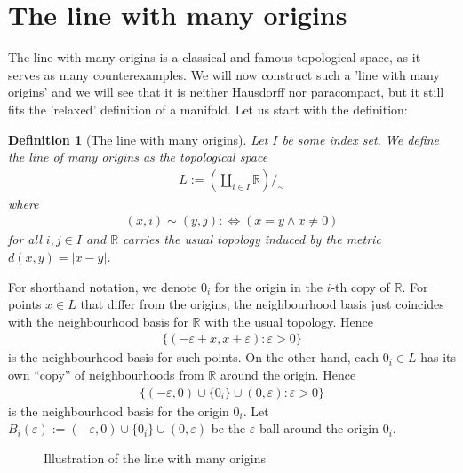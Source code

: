 \documentclass[a4paper, 12pt]{article}
\newtheorem{definition}{Definition}
\theoremstyle{iremark}
\newcommand{\R}{\mathbb{R}}
\begin{document}
\section{The line with many origins}
The line with many origins is a classical and famous topological space, as it serves as many counterexamples. 
We will now construct such a 'line with many origins' and we will see that it is neither Hausdorff nor paracompact, 
but it still fits the 'relaxed' definition of a manifold. Let us start with the definition:
\begin{definition}[The line with many origins]
    Let $I$ be some index set. We define the line of many origins as the topological space
    \begin{align*}
        L := \left(\coprod_{i\in I}\R\right)/_\sim
    \end{align*}
    where
    \begin{align*}
        (x, i)\sim (y,j) :\Leftrightarrow (x=y\land x\neq 0)
    \end{align*}
    for all $i,j\in I$ and $\R$ carries the usual topology induced by the metric $d(x,y) = \vert x-y\vert$.
\end{definition}
For shorthand notation, we denote $0_i$ for the origin in the $i$-th copy of $\R$. For points $x\in L$ that 
differ from the origins, the neighbourhood basis just coincides with the neighbourhood basis for $\R$ with the 
usual topology. Hence
\begin{align*}
    \{(-\varepsilon + x, x + \varepsilon):\varepsilon>0\}
\end{align*}
is the neighbourhood basis for such points. On the other hand, each $0_i\in L$ has its own ``copy'' of neighbourhoods 
from $\R$ around the origin. Hence
\begin{align*}
    \{(-\varepsilon,0)\cup\{0_i\}\cup(0,\varepsilon):\varepsilon>0\}
\end{align*}
is the neighbourhood basis for the origin $0_i$. Let $B_i(\varepsilon) := (-\varepsilon,0)\cup\{0_i\}\cup(0,\varepsilon)$ 
be the $\varepsilon$-ball around the origin $0_i$.
\begin{figure}[h]
    \centering
    \caption{Illustration of the line with many origins}
\end{figure}
\end{document}
